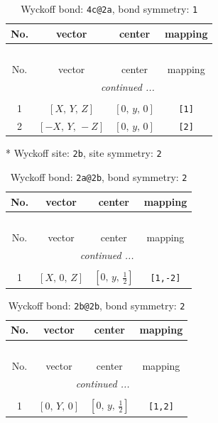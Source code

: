 \documentclass[fleqn,8pt]{jsarticle}
\begin{document}
\renewcommand{\arraystretch}{1.2}
\begin{longtable}{cccc}
\caption{Wyckoff bond: {\tt 4c@2a}, bond symmetry: {\tt 1}}
 \\
 \hline \hline
No. & vector & center & mapping \\ \hline \endfirsthead

\multicolumn{3}{l}{\tablename\ \thetable{}} \\
 \hline \hline
No. & vector & center & mapping \\ \hline \endhead

 \hline \hline
\multicolumn{3}{r}{\footnotesize\it continued ...} \\ \endfoot

 \hline \hline
\multicolumn{3}{r}{} \\ \endlastfoot

1 & $\left[ X,\, Y,\, Z \right]$ & $\left[ 0,\, y,\, 0 \right]$ & {\tt [1]} \\ \hline
2 & $\left[ - X,\, Y,\, - Z \right]$ & $\left[ 0,\, y,\, 0 \right]$ & {\tt [2]} \\
\end{longtable}
* Wyckoff site: {\tt 2b}, site symmetry: {\tt 2}
\renewcommand{\arraystretch}{1.2}
\begin{longtable}{cccc}
\caption{Wyckoff bond: {\tt 2a@2b}, bond symmetry: {\tt 2}}
 \\
 \hline \hline
No. & vector & center & mapping \\ \hline \endfirsthead

\multicolumn{3}{l}{\tablename\ \thetable{}} \\
 \hline \hline
No. & vector & center & mapping \\ \hline \endhead

 \hline \hline
\multicolumn{3}{r}{\footnotesize\it continued ...} \\ \endfoot

 \hline \hline
\multicolumn{3}{r}{} \\ \endlastfoot

1 & $\left[ X,\, 0,\, Z \right]$ & $\left[ 0,\, y,\, \frac{1}{2} \right]$ & {\tt [1,-2]} \\
\end{longtable}
\renewcommand{\arraystretch}{1.2}
\begin{longtable}{cccc}
\caption{Wyckoff bond: {\tt 2b@2b}, bond symmetry: {\tt 2}}
 \\
 \hline \hline
No. & vector & center & mapping \\ \hline \endfirsthead

\multicolumn{3}{l}{\tablename\ \thetable{}} \\
 \hline \hline
No. & vector & center & mapping \\ \hline \endhead

 \hline \hline
\multicolumn{3}{r}{\footnotesize\it continued ...} \\ \endfoot

 \hline \hline
\multicolumn{3}{r}{} \\ \endlastfoot

1 & $\left[ 0,\, Y,\, 0 \right]$ & $\left[ 0,\, y,\, \frac{1}{2} \right]$ & {\tt [1,2]} \\
\end{longtable}
\end{document}
